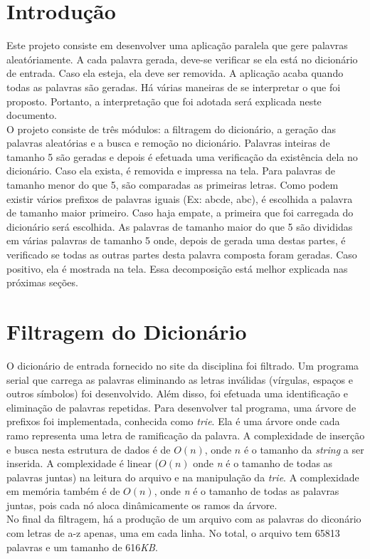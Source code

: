 \documentclass[a4paper]{article}
\begin{document}
\section{Introdução}
\indent \indent Este projeto consiste em desenvolver uma aplicação paralela que gere palavras aleatóriamente. A cada palavra gerada, deve-se verificar se ela está no dicionário de entrada. Caso ela esteja, ela deve ser removida. A aplicação acaba quando todas as palavras são geradas. Há várias maneiras de se interpretar o que foi proposto. Portanto, a interpretação que foi adotada será explicada neste documento.\\
\indent O projeto consiste de três módulos: a filtragem do dicionário, a geração das palavras aleatórias e a busca e remoção no dicionário. Palavras inteiras de tamanho 5 são geradas e depois é efetuada uma verificação da existência dela no dicionário. Caso ela exista, é removida e impressa na tela. Para palavras de tamanho menor do que 5, são comparadas as primeiras letras. Como podem existir vários prefixos de palavras iguais (Ex: abcde, abc), é escolhida a palavra de tamanho maior primeiro. Caso haja empate, a primeira que foi carregada do dicionário será escolhida. As palavras de tamanho maior do que 5 são divididas em várias palavras de tamanho 5 onde, depois de gerada uma destas partes, é verificado se todas as outras partes desta palavra composta foram geradas. Caso positivo, ela é mostrada na tela. Essa decomposição está melhor explicada nas próximas seções.

\section{Filtragem do Dicionário}
\indent \indent O dicionário de entrada fornecido no site da disciplina foi filtrado. Um programa serial que carrega as palavras eliminando as letras inválidas (vírgulas, espaços e outros símbolos) foi desenvolvido. Além disso, foi efetuada uma identificação e eliminação de palavras repetidas. Para desenvolver tal programa, uma árvore de prefixos foi implementada, conhecida como \emph{trie}. Ela é uma árvore onde cada ramo representa uma letra de ramificação da palavra. A complexidade de inserção e busca nesta estrutura de dados é de \begin{math}O(n)\end{math}, onde \begin{math}n\end{math} é o tamanho da \emph{string} a ser inserida. A complexidade é linear (\begin{math}O(n)\end{math} onde \emph{n} é o tamanho de todas as palavras juntas) na leitura do arquivo e na manipulação da \emph{trie}. A complexidade em memória também é de \begin{math}O(n)\end{math}, onde \emph{n} é o tamanho de todas as palavras juntas, pois cada nó aloca dinâmicamente os ramos da árvore.\\
\indent No final da filtragem, há a produção de um arquivo com as palavras do diconário com letras de a-z apenas, uma em cada linha. No total, o arquivo tem 65813 palavras e um tamanho de 616\emph{KB}.
\end{document}
